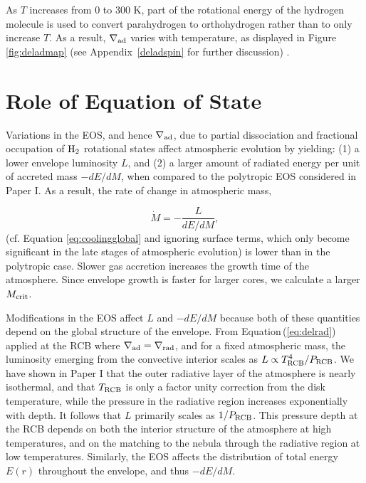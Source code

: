\documentclass[apj]{emulateapj}
\newcommand{\delad}{\nabla_{\rm ad}}
\newcommand{\delrad}{\nabla_{\rm rad}}
\newcommand{\Eq}[1]{Equation\,(\ref{#1})}
\newcommand{\App}[1]{Appendix~\ref{#1}}
\newcommand{\cb}{_{\rm RCB}}
\begin{document}

As $T$ increases from 0 to 300 K, part of the rotational energy of the hydrogen molecule is used to convert parahydrogen to orthohydrogen rather than to only increase $T$. As a result, $\delad$ varies with temperature, as  displayed in Figure \ref{fig:deladmap} (see \App{deladspin} for further discussion) . %



\section{Role of Equation of State}
\label{EOSeffects}

Variations in the EOS, and hence $\delad$, due to partial dissociation and fractional occupation of $\rm{H}_2$ rotational states affect atmospheric evolution by yielding: (1) a lower envelope luminosity $L$, and (2) a larger amount of radiated energy per unit of accreted mass $-dE/dM$, when compared to the polytropic EOS considered in Paper I. As a result, the rate of change in atmospheric mass,

\begin{equation}
\label{eq:dMdt}
\dot{M} = -\frac{L}{dE/dM},
\end{equation}
(cf. Equation \ref{eq:coolingglobal} and ignoring surface terms, which only become significant in the late stages of atmospheric evolution) is lower than in the polytropic case. Slower gas accretion increases the growth time of the atmosphere. Since envelope growth is faster for larger cores, we calculate a larger $M_{\rm crit}$. %

Modifications in the EOS affect $L$ and $-dE/dM$ because both of these quantities depend on the global structure of the envelope. From \Eq{eq:delrad} applied at the RCB where $\delad=\delrad$, and for a fixed atmospheric mass, the luminosity emerging from the convective interior scales as $L \propto T\cb^4/P\cb$. We have shown in Paper I that the outer radiative layer of the atmosphere is nearly isothermal, and that $T\cb$ is only a factor unity correction from the disk temperature, while the pressure in the radiative region increases exponentially with depth. It follows that $L$ primarily scales as $1/P\cb$. This pressure depth at the RCB depends on both the interior structure of the atmosphere at high temperatures, and on the matching to the nebula through the radiative region at low temperatures. Similarly, the EOS affects the distribution of total energy $E(r)$ throughout the envelope, and thus $-dE/dM$.
\end{document}
